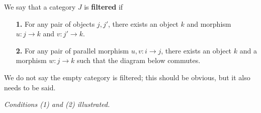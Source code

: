 \begin{definition}
    We say that a category $J$ is \textbf{filtered} if 
    \begin{itemize}
        \item[\textbf{1.}] For any pair of objects $j, j'$, 
        there exists an object $k$ and morphism $u:j \to k$ and $v: j' \to k$. 
        \item[\textbf{2.}] For any pair of parallel morphism $u, v: i \to j$, 
        there exists an object $k$ and a morphism $w: j \to k$ such that the diagram below 
        commutes. 
    \end{itemize}    
    We do not say the empty category is filtered; this should be obvious, but 
    it also needs to be said.

    \begin{center}

        \emph{Conditions (1) and (2) illustrated.}
    \end{center}
    
    
\end{definition}


